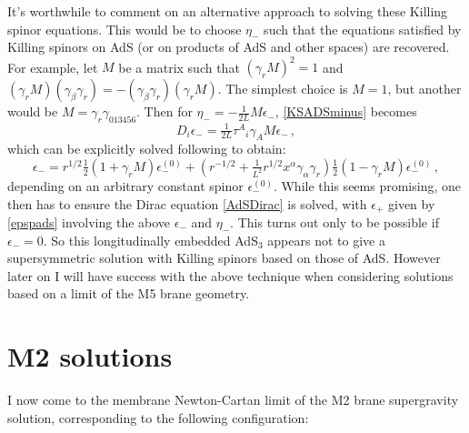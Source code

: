 \documentclass[11pt]{article}
\newcommand{\be}{\begin{equation}}
\newcommand{\ee}{\end{equation}}
\newcommand{\epsc}{\epsilon^{(0)}}
\numberwithin{equation}{section}
\begin{document}
{{It's worthwhile to comment on an alternative approach to solving these Killing spinor equations.
This would be to choose $\eta_-$ such that the equations satisfied by Killing spinors on AdS (or on products of AdS and other spaces) are recovered.
For example, let $M$ be a matrix such that $(\gamma_r M)^2 = 1$ and $(\gamma_r M) (\gamma_\beta \gamma_r) = - (\gamma_\beta \gamma_r) (\gamma_r M)$.
The simplest choice is $M=1$, but another would be $M=\gamma_r \gamma_{013456}$.
Then for $\eta_ - = - \tfrac{1}{2L} M \epsilon_-$, \eqref{KSADSminus} becomes 
\be
D_i \epsilon_-  = \tfrac{1}{2L} \tau^A{}_i \gamma_A M \epsilon_- \,,
\ee
which can be explicitly solved following \cite{Lu:1998nu} to obtain:
\be
\epsilon_- = r^{1/2} \tfrac12 ( 1 + \gamma_r M) \epsc_- 
+ \left(r^{-1/2} + \tfrac{1}{L^2} r^{1/2} x^\alpha \gamma_\alpha \gamma_r  \right) \tfrac12 ( 1 - \gamma_r M) \epsc_- \,,
\label{ADSeps}
\ee
depending on an arbitrary constant spinor $\epsc_-$.
While this seems promising, one then has to ensure the Dirac equation \eqref{AdSDirac} is solved, with $\epsilon_+$ given by \eqref{epspads} involving the above $\epsilon_-$ and $\eta_-$.
This turns out only to be possible if $\epsilon_- = 0$.
So this longitudinally embedded AdS${}_3$ appears not to give a supersymmetric solution with Killing spinors based on those of AdS.
However later on I will have success with the above technique when considering solutions based on a limit of the M5 brane geometry. 




\section{M2 solutions}
\label{sec:M2} 

I now come to the membrane Newton-Cartan limit of the M2 brane supergravity solution, corresponding to the following configuration:

}}
\end{document}

